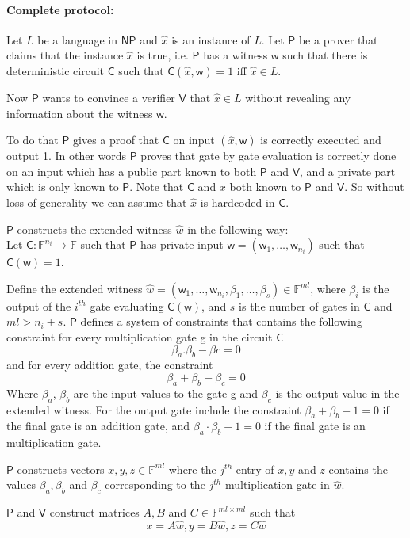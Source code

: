\documentclass[runningheads]{llncs}
\def\prover{\mathsf{P}}
\def\verifier{\mathsf{V}}
\def\NP{\mathsf{NP}}
\def\C{\mathsf{C}} %
\def\wit{\mathsf{w}} %
\def\extwit{\hat{w}} %
\def\stmt{\hat{x}} %
\def\bbF{\mathbb{F}}
\begin{document}
		
	\paragraph{\textbf{Complete protocol:}} Let $L$ be a language in $\NP$ and $\stmt$ is an instance of $L$. Let $\prover$ be a prover that claims that the instance $\stmt$ is true, i.e. $\prover$ has a witness $\wit$ such that there is deterministic circuit $\C$ such that $\C(\stmt,\wit)=1$ iff $\stmt \in L$. 
	
	Now $\prover$ wants to convince a verifier $\verifier$ that $\stmt\in L$ without revealing any information about the witness $\wit$. 
	
	To do that $\prover$ gives a proof that $\C$ on input $(\stmt, \wit)$ is correctly executed and output 1. In other words $\prover$ proves that gate by gate evaluation is correctly done on an input which has a public part known to both $\prover$ and $\verifier$, and a private part which is only known to $\prover$. 
	Note that $\C$ and $x$ both known to $\prover$ and $\verifier$. So without loss of generality we can assume that $\stmt$ is hardcoded in $\C$.
	
	$\prover$ constructs the extended witness $\extwit$ in the following way: \\
	Let $\C:\bbF^{n_i}\rightarrow \bbF$ such that $\prover$ has private input $\wit = (\wit_1,\ldots, \wit_{n_i})$ such that $\C(\wit)=1$.
	
	Define the extended witness $\extwit = (\wit_1,\ldots,\wit_{n_i}, \beta_1,\ldots, \beta_s) \in \bbF^{ml}$, where $\beta_i$ is the output of the $i^{th}$ gate evaluating $\C(\wit)$, and $s$ is the number of gates in $\C$ and $ml>n_i + s$. $\prover$ defines a system of constraints that contains the following constraint for every multiplication gate g in the circuit $\C$ $$\beta_{a}.\beta_{b}-\beta{c}=0$$
	and for every addition gate, the constraint 
	$$\beta_a + \beta_b - \beta_c = 0$$
	Where $\beta_a$, $\beta_b$ are the input values to the gate g and $\beta_c$ is the output value in the extended witness. For the output gate include the constraint $\beta_a + \beta_b - 1 = 0$ if the final gate is an addition gate, and $\beta_a\cdot \beta_b - 1 = 0$ if the final gate is an multiplication gate. 
	
	$\prover$ constructs vectors $x,y,z \in \bbF^{ml}$ where the $j^{th}$ entry of $x,y$ and $z$ contains the values $\beta_a, \beta_b$ and $\beta_c$ corresponding to the $j^{th}$ multiplication gate in $\extwit$.
	
	$\prover$ and $\verifier$ construct matrices $A, B$ and $C \in \bbF^{ml \times ml}$ such that 
	$$x = A \extwit, y= B \extwit, z= C \extwit$$
	
\end{document}
